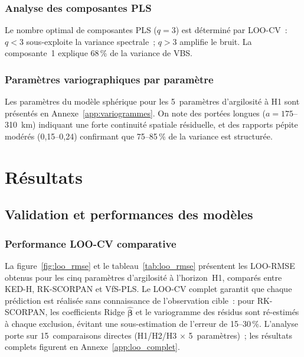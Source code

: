 \documentclass[10pt,a4paper,twocolumn]{article}
\begin{document}
	\subsubsection{Analyse des composantes PLS}
	
	Le nombre optimal de composantes PLS ($q=3$) est déterminé
	par LOO-CV~: $q<3$ sous-exploite la variance spectrale~;
	$q>3$ amplifie le bruit.
	La composante~1 explique 68\,\% de la variance de VBS.
	
	\subsubsection{Paramètres variographiques par paramètre}
	
	Les paramètres du modèle sphérique pour les 5~paramètres
	d'argilosité à H1 sont présentés en
	Annexe~\ref{app:variogrammes}. On note des portées longues
	($a=175$--310~km) indiquant une forte continuité spatiale
	résiduelle, et des rapports pépite modérés (0{,}15--0{,}24)
	confirmant que 75--85\,\% de la variance est structurée.
	
	\section{Résultats}
	\label{sec:resultats}
	
	\subsection{Validation et performances des modèles}
	\label{subsec:loo_resultats}
	
	\subsubsection{Performance LOO-CV comparative}

	La figure~\ref{fig:loo_rmse} et le tableau~\ref{tab:loo_rmse}
	présentent les LOO-RMSE obtenus pour les cinq paramètres
	d'argilosité à l'horizon~H1, comparés entre KED-H, RK-SCORPAN
	et VfS-PLS. Le LOO-CV complet garantit que chaque prédiction
	est réalisée sans connaissance de l'observation cible~:
	pour RK-SCORPAN, les coefficients Ridge $\hat{\bm{\beta}}$
	et le variogramme des résidus sont ré-estimés à chaque exclusion,
	évitant une sous-estimation de l'erreur de 15--30\,\%.
	L'analyse porte sur 15~comparaisons directes (H1/H2/H3
	$\times$ 5~paramètres)~; les résultats complets figurent
	en Annexe~\ref{app:loo_complet}.
\end{document}
